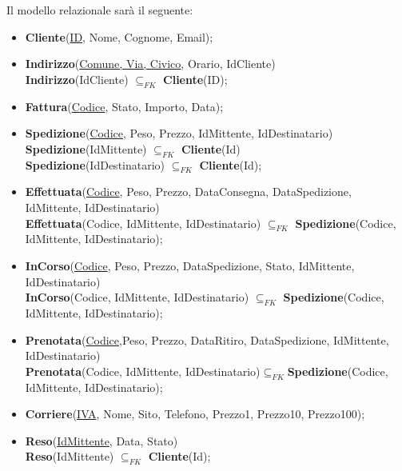 \documentclass[a4paper,12pt]{article}
\begin{document}
Il modello relazionale sarà il seguente:
\begin{itemize}
  \item \textbf{Cliente}(\underline{ID}, Nome, Cognome, Email);
  \item \textbf{Indirizzo}(\underline{Comune, Via, Civico}, Orario, IdCliente) \\ \textbf{Indirizzo}(IdCliente) $\subseteq _{FK}$ \textbf{Cliente}(ID); 
  \item \textbf{Fattura}(\underline{Codice}, Stato, Importo, Data);
  \item \textbf{Spedizione}(\underline{Codice}, Peso, Prezzo, IdMittente, IdDestinatario) \\ \textbf{Spedizione}(IdMittente) $\subseteq _{FK}$ \textbf{Cliente}(Id) \\ \textbf{Spedizione}(IdDestinatario) $\subseteq _{FK}$ \textbf{Cliente}(Id);
  \item \textbf{Effettuata}(\underline{Codice}, Peso, Prezzo, DataConsegna, DataSpedizione, IdMittente, IdDestinatario) \\ \textbf{Effettuata}(Codice, IdMittente, IdDestinatario) $\subseteq _{FK}$ \textbf{Spedizione}(Codice, IdMittente, IdDestinatario);
  \item \textbf{InCorso}(\underline{Codice}, Peso, Prezzo, DataSpedizione, Stato, IdMittente, IdDestinatario) \\ \textbf{InCorso}(Codice, IdMittente, IdDestinatario) $\subseteq _{FK}$ \textbf{Spedizione}(Codice, IdMittente, IdDestinatario);
  \item \textbf{Prenotata}(\underline{Codice},Peso, Prezzo, DataRitiro, DataSpedizione, IdMittente, IdDestinatario) \\\textbf{Prenotata}(Codice, IdMittente, IdDestinatario)$\subseteq _{FK}$\textbf{Spedizione}(Codice, IdMittente, IdDestinatario);
  \item \textbf{Corriere}(\underline{IVA}, Nome, Sito, Telefono, Prezzo1, Prezzo10, Prezzo100);
  \item \textbf{Reso}(\underline{IdMittente}, Data, Stato)\\ \textbf{Reso}(IdMittente) $\subseteq _{FK}$ \textbf{Cliente}(Id);

\end{itemize}
\end{document}
